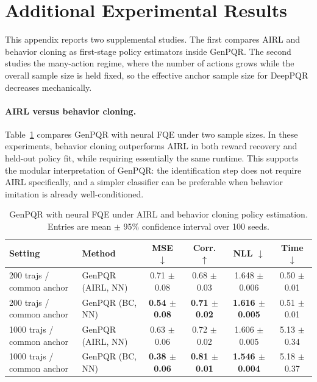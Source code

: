\section{Additional Experimental Results}
\label{app:additional-experiments}

This appendix reports two supplemental studies. The first compares AIRL and
behavior cloning as first-stage policy estimators inside GenPQR. The second
studies the many-action regime, where the number of actions grows while the
overall sample size is held fixed, so the effective anchor sample size for
DeepPQR decreases mechanically.

\paragraph{AIRL versus behavior cloning.}
Table~\ref{tab:app-airl-vs-bc} compares GenPQR with neural FQE under two sample
sizes. In these experiments, behavior cloning outperforms AIRL in both reward
recovery and held-out policy fit, while requiring essentially the same runtime.
This supports the modular interpretation of GenPQR: the identification step
does not require AIRL specifically, and a simpler classifier can be preferable
when behavior imitation is already well-conditioned.

\begin{table}[htb]
\centering
\caption{GenPQR with neural FQE under AIRL and behavior cloning policy estimation. Entries are mean $\pm$ 95\% confidence interval over 100 seeds.}
\label{tab:app-airl-vs-bc}
\scriptsize
\setlength{\tabcolsep}{4pt}
\begin{tabular}{llcccc}
\toprule
Setting & Method & MSE $\downarrow$ & Corr. $\uparrow$ & NLL $\downarrow$ & Time $\downarrow$ \\
\midrule
200 trajs / common anchor & GenPQR (AIRL, NN) & 0.71 $\pm$ 0.08 & 0.68 $\pm$ 0.03 & 1.648 $\pm$ 0.006 & 0.50 $\pm$ 0.01 \\
200 trajs / common anchor & GenPQR (BC, NN) & \textbf{0.54 $\pm$ 0.08} & \textbf{0.71 $\pm$ 0.02} & \textbf{1.616 $\pm$ 0.005} & 0.51 $\pm$ 0.01 \\
\midrule
1000 trajs / common anchor & GenPQR (AIRL, NN) & 0.63 $\pm$ 0.06 & 0.72 $\pm$ 0.02 & 1.606 $\pm$ 0.005 & 5.13 $\pm$ 0.34 \\
1000 trajs / common anchor & GenPQR (BC, NN) & \textbf{0.38 $\pm$ 0.06} & \textbf{0.81 $\pm$ 0.01} & \textbf{1.546 $\pm$ 0.004} & 5.18 $\pm$ 0.37 \\
\bottomrule
\end{tabular}
\end{table}

